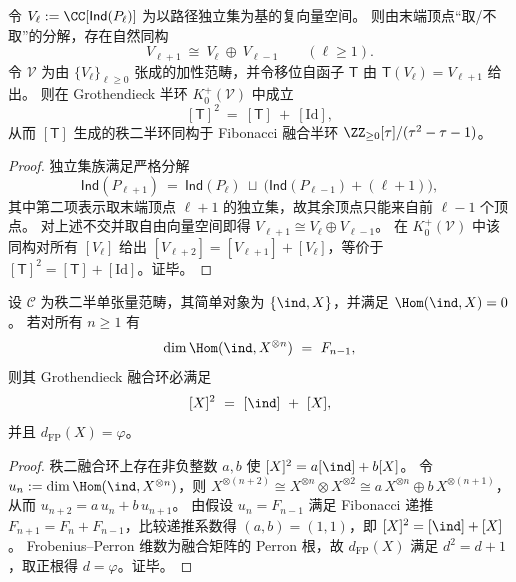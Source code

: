 \begin{proposition}[由路径独立集诱导的秩二融合半环]\label{prop:pom-fiber-grothendieck-fibonacci-fusion-semiring}
令 \(V_\ell:=\CC[\mathsf{Ind}(P_\ell)]\) 为以路径独立集为基的复向量空间。
则由末端顶点“取/不取”的分解，存在自然同构
\[
V_{\ell+1}\ \cong\ V_\ell\ \oplus\ V_{\ell-1}\qquad(\ell\ge 1).
\]
令 \(\mathcal V\) 为由 \(\{V_\ell\}_{\ell\ge 0}\) 张成的加性范畴，并令移位自函子 \(\mathsf T\) 由 \(\mathsf T(V_\ell)=V_{\ell+1}\) 给出。
则在 Grothendieck 半环 \(K_0^+(\mathcal V)\) 中成立
\[
[\mathsf T]^2\ =\ [\mathsf T]\ +\ [\mathrm{Id}],
\]
从而 \([\mathsf T]\) 生成的秩二半环同构于 Fibonacci 融合半环 \(\ZZ_{\ge 0}[\tau]/(\tau^2-\tau-1)\)。
\end{proposition}

\begin{proof}
独立集族满足严格分解
\[
\mathsf{Ind}(P_{\ell+1})\ =\ \mathsf{Ind}(P_\ell)\ \sqcup\ \bigl(\mathsf{Ind}(P_{\ell-1})+(\ell+1)\bigr),
\]
其中第二项表示取末端顶点 \(\ell+1\) 的独立集，故其余顶点只能来自前 \(\ell-1\) 个顶点。
对上述不交并取自由向量空间即得 \(V_{\ell+1}\cong V_\ell\oplus V_{\ell-1}\)。
在 \(K_0^+(\mathcal V)\) 中该同构对所有 \([V_\ell]\) 给出 \([V_{\ell+2}]=[V_{\ell+1}]+[V_\ell]\)，等价于 \([\mathsf T]^2=[\mathsf T]+[\mathrm{Id}]\)。证毕。
\end{proof}

\begin{proposition}\label{prop:pom-rank2-rigidity-fibonacci-fusion-law}
设 \(\mathcal C\) 为秩二半单张量范畴，其简单对象为 \(\{\ind,X\}\)，并满足 \(\Hom(\ind,X)=0\)。
若对所有 \(n\ge 1\) 有
\[
\dim\Hom(\ind, X^{\otimes n})\ =\ F_{n-1},
\]
则其 Grothendieck 融合环必满足
\[
[X]^2\ =\ [\ind]\ +\ [X],
\]
并且 \(d_{\mathrm{FP}}(X)=\varphi\)。
\end{proposition}

\begin{proof}
秩二融合环上存在非负整数 \(a,b\) 使 \( [X]^2=a[\ind]+b[X]\)。
令 \(u_n:=\dim\Hom(\ind,X^{\otimes n})\)，则
\(
X^{\otimes(n+2)}\cong X^{\otimes n}\otimes X^{\otimes 2}\cong a\,X^{\otimes n}\oplus b\,X^{\otimes(n+1)}
\)，
从而 \(u_{n+2}=a\,u_n+b\,u_{n+1}\)。
由假设 \(u_n=F_{n-1}\) 满足 Fibonacci 递推 \(F_{n+1}=F_n+F_{n-1}\)，比较递推系数得 \((a,b)=(1,1)\)，即 \([X]^2=[\ind]+[X]\)。
Frobenius--Perron 维数为融合矩阵的 Perron 根，故 \(d_{\mathrm{FP}}(X)\) 满足 \(d^2=d+1\)，取正根得 \(d=\varphi\)。证毕。
\end{proof}

